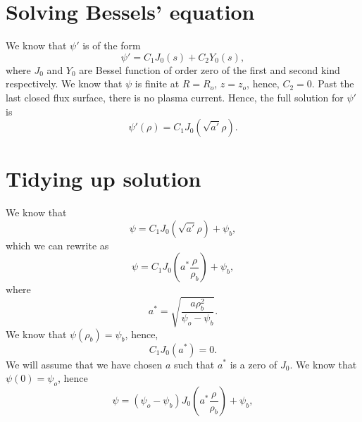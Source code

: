 \documentclass{article}
\begin{document}
\section{Solving Bessels' equation}

We know that $\psi'$ is of the form
\[\psi' = C_1J_0(s) + C_2Y_0(s),\]
where $J_0$ and $Y_0$ are Bessel function of order zero of the first and second kind respectively. We know that $\psi$ is finite at $R=R_o$, $z=z_o$, hence, $C_2=0$.
Past the last closed flux surface, there is no plasma current. 
Hence, the full solution for $\psi'$ is
\[\psi'(\rho) = C_1J_0(\sqrt{a'}\rho).\]

\section{Tidying up solution}

We know that
\[\psi = C_1J_0(\sqrt{a'}\rho) + \psi_b,\]
which we can rewrite as
\[\psi = C_1J_0\left(a^*\frac{\rho}{\rho_b}\right) + \psi_b,\]
where
\[a^* = \sqrt{\frac{a\rho_b^2}{\psi_o-\psi_b}}.\]
We know that $\psi(\rho_b)=\psi_b$, hence,
\[ C_1J_0(a^*)=0.\]
We will assume that we have chosen $a$ such that $a^*$ is a zero of $J_0$.
We know that $\psi(0) = \psi_o$, hence
\[\psi = (\psi_o - \psi_b)J_0\left(a^*\frac{\rho}{\rho_b}\right) + \psi_b,\]



\end{document}
